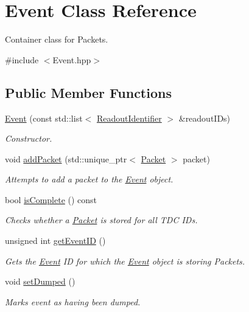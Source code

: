 \hypertarget{class_event}{}\section{Event Class Reference}
\label{class_event}


Container class for Packets.  




{\ttfamily \#include $<$Event.\+hpp$>$}

\subsection*{Public Member Functions}
\begin{DoxyCompactItemize}
\item 
\hyperlink{class_event_a8c190b8279bb1a30b0f42a793f5342d2}{Event} (const std\+::list$<$ \hyperlink{class_readout_identifier}{Readout\+Identifier} $>$ \&readout\+I\+Ds)
\begin{DoxyCompactList}\small\item\em Constructor. \end{DoxyCompactList}\item 
void \hyperlink{class_event_a08c4689086126f702d3b14be99461c98}{add\+Packet} (std\+::unique\+\_\+ptr$<$ \hyperlink{class_packet}{Packet} $>$ packet)
\begin{DoxyCompactList}\small\item\em Attempts to add a packet to the \hyperlink{class_event}{Event} object. \end{DoxyCompactList}\item 
bool \hyperlink{class_event_a2a00b2c0c579397ac93c834cf987cbd9}{is\+Complete} () const
\begin{DoxyCompactList}\small\item\em Checks whether a \hyperlink{class_packet}{Packet} is stored for all T\+DC I\+Ds. \end{DoxyCompactList}\item 
unsigned int \hyperlink{class_event_a3f48bec589c70aa0d36fd5cb253ad88c}{get\+Event\+ID} ()
\begin{DoxyCompactList}\small\item\em Gets the \hyperlink{class_event}{Event} ID for which the \hyperlink{class_event}{Event} object is storing Packets. \end{DoxyCompactList}\item 
void \hyperlink{class_event_ae0c56d36ba53360683e0917e4caac6ed}{set\+Dumped} ()
\begin{DoxyCompactList}\small\item\em Marks event as having been dumped. \end{DoxyCompactList}\item 

\end{DoxyCompactItemize}
